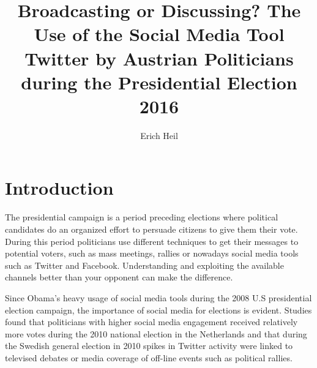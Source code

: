 \documentclass{llncs}
\begin{document}
%
\frontmatter          %
\mainmatter              %
%
\title{Broadcasting or Discussing? The Use of the Social Media Tool Twitter by Austrian
	Politicians during the Presidential Election 2016}
%
%
\author{Erich Heil}
%
%
%

\maketitle              %


%
\section{Introduction}
%
The presidential campaign is a period preceding elections where political candidates do an organized effort to persuade citizens to give them their vote. During this period politicians use different techniques to get their messages to potential voters, such as mass meetings, rallies or nowadays social media tools such as Twitter and Facebook. Understanding and exploiting the available channels better than your opponent can make the difference. 

Since Obama's heavy usage of social media tools during the 2008 U.S presidential election campaign\cite{aaker2010obama}, the importance of social media for elections is evident. Studies found that politicians with higher social media engagement received relatively more votes during the 2010 national election in the Netherlands\cite{effing2011social} and that during the Swedish general election in 2010 spikes in Twitter activity were linked to televised debates or media coverage of off-line events such as political rallies\cite{larsson2012studying}.
\end{document}
